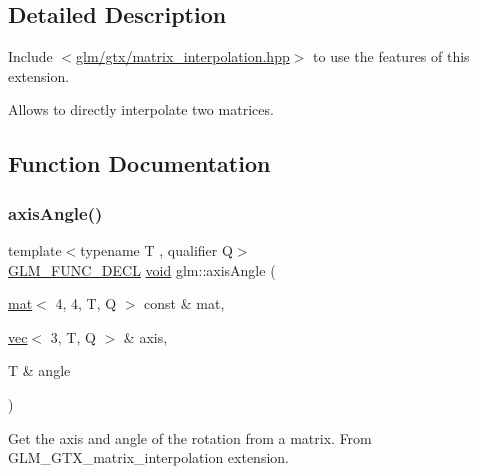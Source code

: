 \subsection{Detailed Description}
Include $<$\hyperlink{matrix__interpolation_8hpp}{glm/gtx/matrix\+\_\+interpolation.\+hpp}$>$ to use the features of this extension.

Allows to directly interpolate two matrices. 

\subsection{Function Documentation}
\mbox{\label{group__gtx__matrix__interpolation_ga97f160158906ea89676f56cc4697ec98}} 
\subsubsection{\texorpdfstring{axis\+Angle()}{axisAngle()}}
{\footnotesize\ttfamily template$<$typename T , qualifier Q$>$ \\
\hyperlink{setup_8hpp_ab2d052de21a70539923e9bcbf6e83a51}{G\+L\+M\+\_\+\+F\+U\+N\+C\+\_\+\+D\+E\+CL} \hyperlink{_s_d_l__opengles2__gl2ext_8h_ae5d8fa23ad07c48bb609509eae494c95}{void} glm\+::axis\+Angle (\begin{DoxyParamCaption}\item[{\hyperlink{structglm_1_1mat}{mat}$<$ 4, 4, T, Q $>$ const \&}]{mat,  }\item[{\hyperlink{structglm_1_1vec}{vec}$<$ 3, T, Q $>$ \&}]{axis,  }\item[{T \&}]{angle }\end{DoxyParamCaption})}

Get the axis and angle of the rotation from a matrix. From G\+L\+M\+\_\+\+G\+T\+X\+\_\+matrix\+\_\+interpolation extension. \mbox{\label{group__gtx__matrix__interpolation_ga992a5db71893ed1ba6ebac99f0f69831}} 
